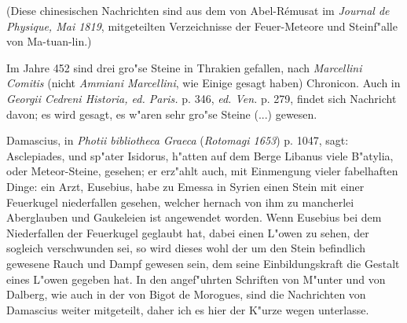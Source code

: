 \documentclass[a4paper, 11pt, oneside, polutonikogreek, german]{article}
\begin{document}
(Diese chinesischen Nachrichten sind aus dem von Abel-Rémusat im \emph{Journal de Physique, Mai 1819}, mitgeteilten Verzeichnisse der Feuer-Meteore und Steinf"alle von Ma-tuan-lin.)

Im Jahre 452 sind drei gro"se Steine in Thrakien gefallen, nach \emph{Marcellini Comitis} (nicht \emph{Ammiani Marcellini}, wie Einige gesagt haben) Chronicon. Auch in \emph{Georgii Cedreni Historia, ed. Paris.} p. 346, \emph{ed. Ven.} p. 279, findet sich Nachricht davon; es wird gesagt, es w"aren sehr gro"se Steine (...) gewesen.

Damascius, in \emph{Photii bibliotheca Graeca} (\emph{Rotomagi 1653}) p. 1047, sagt: Asclepiades, und sp"ater Isidorus, h"atten auf dem Berge Libanus viele B"atylia, oder Meteor-Steine, gesehen; er erz"ahlt auch, mit Einmengung vieler fabelhaften Dinge: ein Arzt, Eusebius, habe zu Emessa in Syrien einen Stein mit einer Feuerkugel niederfallen gesehen, welcher hernach von ihm zu mancherlei Aberglauben und Gaukeleien ist angewendet worden. Wenn Eusebius bei dem Niederfallen der Feuerkugel geglaubt hat, dabei einen L"owen zu sehen, der sogleich verschwunden sei, so wird dieses wohl der um den Stein befindlich gewesene Rauch und Dampf gewesen sein, dem seine Einbildungskraft die Gestalt eines L"owen gegeben hat. In den angef"uhrten Schriften von M"unter und von Dalberg, wie auch in der von Bigot de Morogues, sind die Nachrichten von Damascius weiter mitgeteilt, daher ich es hier der K"urze wegen unterlasse.
\end{document}
